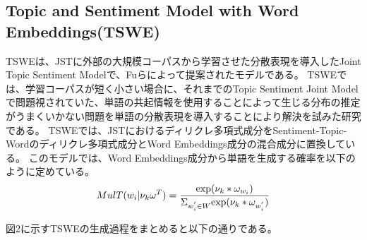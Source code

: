 \documentclass[uplatex]{jsarticle}
\begin{document}
\subsection{Topic and Sentiment Model with Word Embeddings(TSWE)}
TSWEは、JSTに外部の大規模コーパスから学習させた分散表現を導入したJoint Topic Sentiment Modelで、Fuら\cite{TSWE}によって提案されたモデルである。
TSWEでは、学習コーパスが短く小さい場合に、それまでのTopic Sentiment Joint Modelで問題視されていた、単語の共起情報を使用することによって生じる分布の推定がうまくいかない問題を単語の分散表現を導入することにより解決を試みた研究である。
TSWEでは、JSTにおけるディリクレ多項式成分をSentiment-Topic-Wordのディリクレ多項式成分とWord Embeddings成分の混合成分に置換している。
このモデルでは、Word Embeddings成分から単語を生成する確率を以下のように定めている。
\begin{equation}
    MulT(w_{i}|\nu_{k}\omega^{T}) = \frac{{\rm exp}(\nu_{k}*\omega_{w_{i}})}{\Sigma_{w_{i}^{'}\in{W}}{\rm exp}(\nu_{k}*\omega_{w_{i}^{'}})}
\end{equation}

図2に示すTSWEの生成過程をまとめると以下の通りである。
\end{document}
